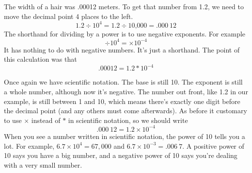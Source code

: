 The width of a hair was .00012 meters.  To get that number from 1.2, we need to move the decimal point 4 places to the left.  $$1.2 \div 10^4 = 1.2 \div \text{10,000} = .000~12$$
The shorthand for dividing by a power is to use negative exponents.  For example
$$ \div 10^4 = \times 10^{-4}$$
It has nothing to do with negative numbers.  It's just a shorthand.
The point of this calculation was that $$.00012= 1.2\ast10^{-4}$$

Once again we have scientific notation.  The base is still 10.  The exponent is still a whole number, although now it's negative.  The number out front, like 1.2 in our example, is still between 1 and 10, which means there's exactly one digit before the decimal point (and any others must come afterwards).  As before it customary to use $\times$ instead of $\ast$ in scientific notation, so we should write
$$.000~12= 1.2 \times 10^{-4}$$
When you see a number written in scientific notation, the power of 10 tells you a lot.  For example, $6.7 \times 10^4 = 67,000$ and $6.7 \times 10^{-3} = .006~7$.  A positive power of 10 says you have a big number, and a negative power of 10 says you're dealing with a very small number.  

 